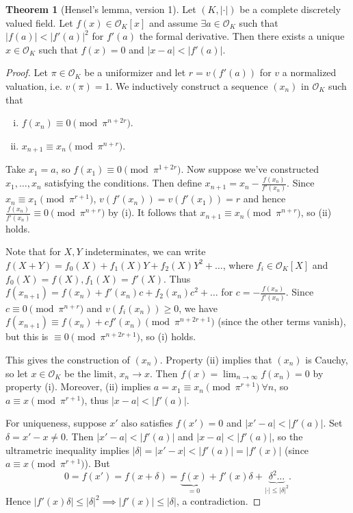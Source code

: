 \documentclass{article}
\theoremstyle{definition}
\newtheorem{theorem}{Theorem}[section]
\begin{document}
\begin{theorem}[Hensel's lemma, version 1]
    Let $(K, |\cdot|)$ be a complete discretely valued field. Let $f(x) \in \mathcal{O}_K[x]$ and assume $\exists a \in \mathcal{O}_K$ such that $|f(a)| < |f'(a)|^2$ for $f'(a)$ the formal derivative. Then there exists a unique $x \in \mathcal{O}_K$ such that $f(x)=0$ and $|x-a|< |f'(a)|$.
\end{theorem}
\begin{proof}
    Let $\pi \in \mathcal{O}_K$ be a uniformizer and let $r = v(f'(a))$ for $v$ a normalized valuation, i.e. $v(\pi)=1$. We inductively construct a sequence $(x_n)$ in $\mathcal{O}_K$ such that
    \begin{enumerate}[(i)]
        \item $f(x_n) \equiv 0 \pmod{\pi^{n+2r}}$.
        \item $x_{n+1} \equiv x_n \pmod{\pi^{n+r}}$.
    \end{enumerate}
    Take $x_1 = a$, so $f(x_1) \equiv 0 \pmod{\pi^{1+2r}}$. Now suppose we've constructed $x_1, \ldots, x_n$ satisfying the conditions. Then define $x_{n+1} = x_n - \frac{f(x_n)}{f'(x_n)}$. Since $x_n \equiv x_1 \pmod{\pi^{r+1}}$, $v(f'(x_n)) = v(f'(x_1)) = r$ and hence $\frac{f(x_n)}{f'(x_n)} \equiv 0 \pmod{\pi^{n+r}}$ by (i). It follows that $x_{n+1} \equiv x_n \pmod{\pi^{n+r}}$, so (ii) holds.
    \vspace{1mm}
     
    Note that for $X, Y$ indeterminates, we can write $f(X+Y) = f_0(X) + f_1(X)Y + f_2(X)Y^2 + \ldots$, where $f_i \in \mathcal{O}_K[X]$ and $f_0(X) = f(X), f_1(X) = f'(X)$. Thus $f(x_{n+1}) = f(x_n) + f'(x_n)c + f_2(x_n)c^2 + \ldots$ for $c = - \frac{f(x_n)}{f'(x_n)}$. Since $c \equiv 0 \pmod{\pi^{n+r}}$ and $v(f_i(x_n)) \ge 0$, we have $f(x_{n+1}) \equiv f(x_n) + c f'(x_n) \pmod{\pi^{n+2r+1}}$ (since the other terms vanish), but this is $\equiv 0 \pmod{\pi^{n+2r+1}}$, so (i) holds.
    \vspace{1mm}
     
    This gives the construction of $(x_n)$. Property (ii) implies that $(x_n)$ is Cauchy, so let $x \in \mathcal{O}_K$ be the limit, $x_n \to x$. Then $f(x) = \lim_{n \to \infty} f(x_n) = 0$ by property (i). Moreover, (ii) implies $a = x_1 \equiv x_n \pmod{\pi^{r+1}} ~\forall n$, so $a \equiv x \pmod{\pi^{r+1}}$, thus $|x-a| < |f'(a)|$.
    \vspace{1mm}
     
    For uniqueness, suppose $x'$ also satisfies $f(x') = 0$ and $|x'-a|<|f'(a)|$. Set $\delta = x' - x \neq 0$. Then $|x'-a|<|f'(a)|$ and $|x-a|<|f'(a)|$, so the ultrametric inequality implies $|\delta| = |x'-x| < |f'(a)| = |f'(x)|$ (since $a \equiv x \pmod{\pi^{r+1}}$). But \[
    0 = f(x') = f(x+\delta) = \underbrace{f(x)}_{=0} + f'(x)\delta + \underbrace{\delta^2 \ldots}_{|\cdot|\le |\delta|^2}.
    \]
    Hence $|f'(x) \delta|\le |\delta|^2 \implies |f'(x)| \le |\delta|$, a contradiction.
\end{proof}
\end{document}

